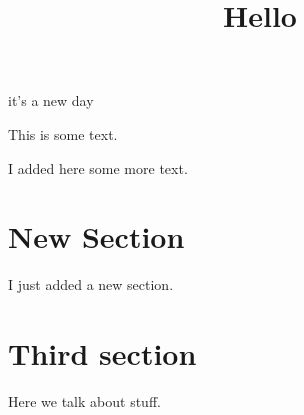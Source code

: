 \documentclass{article}
\title{Hello}
\begin{document}
\maketitle

it's a new day
	
This is some text.

I added here some more text.

\section{New Section}

I just added a new section. 


\section{Third section}

Here we talk about stuff. 
\end{document}

